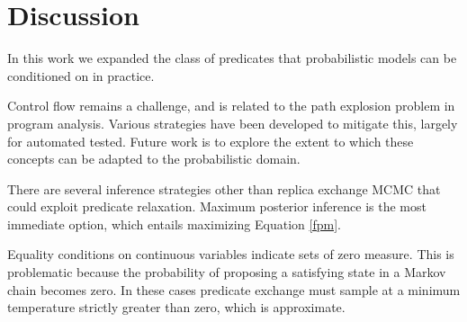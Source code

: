 \section{Discussion}
In this work we expanded the class of predicates that probabilistic models can be conditioned on in practice.

Control flow remains a challenge, and is related to the path explosion problem in program analysis.
Various strategies have been developed \cite{cadar2008exe, sen2005cute} to mitigate this, largely for automated tested.
Future work is to explore the extent to which these concepts can be adapted to the probabilistic domain.

There are several inference strategies other than replica exchange MCMC that could exploit predicate relaxation.
Maximum posterior inference is the most immediate option, which entails maximizing Equation \ref{fpm}.


Equality conditions on continuous variables indicate sets of zero measure.
This is problematic because the probability of proposing a satisfying state in a Markov chain becomes zero.
In these cases predicate exchange must sample at a minimum temperature strictly greater than zero, which is approximate.